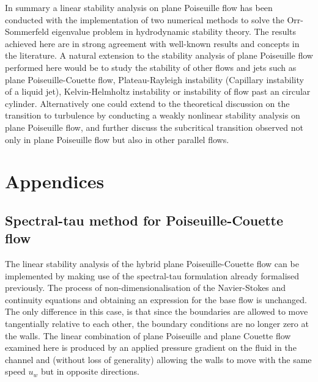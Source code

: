 \documentclass[a4paper, 12pt, twoside, openright]{article}
\numberwithin{equation}{section}
\begin{document}

In summary a linear stability analysis on plane Poiseuille flow has been conducted with the implementation of two numerical methods to solve the Orr-Sommerfeld eigenvalue problem in hydrodynamic stability theory. The results achieved here are in strong agreement with well-known results and concepts in the literature. A natural extension to the stability analysis of plane Poiseuille flow performed here would be to study the stability of other flows and jets such as plane Poiseuille-Couette flow, Plateau-Rayleigh instability (Capillary instability of a liquid jet), Kelvin-Helmholtz instability or instability of flow past an circular cylinder. Alternatively one could extend to the theoretical discussion on the transition to turbulence by conducting a weakly nonlinear stability analysis on plane Poiseuille flow, and further discuss the subcritical transition observed not only in plane Poiseuille flow but also in other parallel flows.  



% 
%
%
%

\newpage
\appendix
\renewcommand{\theequation}{A-\arabic{equation}}
\section*{Appendices}
\renewcommand{\thesubsection}{\Alph{subsection}}

\subsection{Spectral-tau method for Poiseuille-Couette flow}

The linear stability analysis of the hybrid plane Poiseuille-Couette flow can be implemented by making use of the spectral-tau formulation already formalised previously. The process of non-dimensionalisation of the Navier-Stokes and continuity equations and obtaining an expression for the base flow is unchanged. The only difference in this case, is that since the boundaries are allowed to move tangentially relative to each other, the boundary conditions are no longer zero at the walls. The linear combination of plane Poiseuille and plane Couette flow examined here is produced by an applied pressure gradient on the fluid in the channel and (without loss of generality) allowing the walls to move with the same speed $u_w$ but in opposite directions. 
\end{document}
